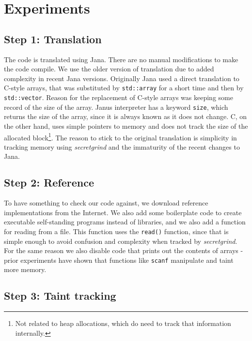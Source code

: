 \documentclass[a4paper,10pt,openright]{memoir}
\newcommand{\term}[1]{\textit{#1}}
\newcommand{\code}[1]{\texttt{#1}}
\begin{document}

\section{Experiments}

\subsection{Step 1: Translation}

The code is translated using Jana. There are no manual modifications to 
make the code compile. We use the older version of translation due to 
added complexity in recent Jana versions. Originally Jana used a direct 
translation to C-style arrays, that was substituted by 
\code{std::array} for a short time and then by \code{std::vector}. 
Reason for the replacement of C-style arrays was keeping some record of 
the size of the array. Janus interpreter has a keyword \code{size}, 
which returns the size of the array, since it is always known as it 
does not change. C, on the other hand, uses simple pointers to memory 
and does not track the size of the allocated block\footnote{Not related 
to heap allocations, which do need to track that information 
internally.}. The reason to stick to the original translation is 
simplicity in tracking memory using \term{secretgrind} and the 
immaturity of the recent changes to Jana.

\subsection{Step 2: Reference}

To have something to check our code against, we download reference 
implementations from the Internet. We also add some boilerplate code to 
create executable self-standing programs instead of libraries, and we 
also add a function for reading from a file. This function uses the 
\code{read()} function, since that is simple enough to avoid confusion 
and complexity when tracked by \term{secretgrind}. For the same reason 
we also disable code that prints out the contents of arrays - prior 
experiments have shown that functions like \code{scanf} manipulate and 
taint more memory.

\subsection{Step 3: Taint tracking}
\end{document}
